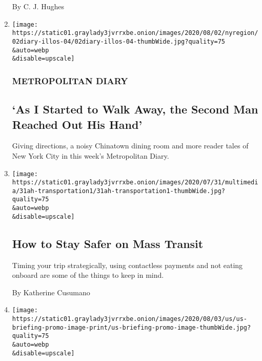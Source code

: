 \begin{enumerate}
  By C. J. Hughes
\item
  \href{/2020/08/02/nyregion/metropolitan-diary.html}{}

  \texttt{[image: https://static01.graylady3jvrrxbe.onion/images/2020/08/02/nyregion/02diary-illos-04/02diary-illos-04-thumbWide.jpg?quality=75\\\&auto=webp\\\&disable=upscale]}

  \hypertarget{metropolitan-diary}{%
  \subsubsection{METROPOLITAN DIARY}\label{metropolitan-diary}}

  \hypertarget{as-i-started-to-walk-away-the-second-man-reached-out-his-hand}{%
  \subsection{`As I Started to Walk Away, the Second Man Reached Out His
  Hand'}\label{as-i-started-to-walk-away-the-second-man-reached-out-his-hand}}

  Giving directions, a noisy Chinatown dining room and more reader tales
  of New York City in this week's Metropolitan Diary.
\item
  \href{/2020/08/01/at-home/coronavirus-public-transportation-subway.html}{}

  \texttt{[image: https://static01.graylady3jvrrxbe.onion/images/2020/07/31/multimedia/31ah-transportation1/31ah-transportation1-thumbWide.jpg?quality=75\\\&auto=webp\\\&disable=upscale]}

  \hypertarget{how-to-stay-safer-on-mass-transit}{%
  \subsection{How to Stay Safer on Mass
  Transit}\label{how-to-stay-safer-on-mass-transit}}

  Timing your trip strategically, using contactless payments and not
  eating onboard are some of the things to keep in mind.

  By Katherine Cusumano
\item
  \href{/2020/08/01/world/coronavirus-covid-19.html}{}

  \texttt{[image: https://static01.graylady3jvrrxbe.onion/images/2020/08/03/us/us-briefing-promo-image-print/us-briefing-promo-image-thumbWide.jpg?quality=75\\\&auto=webp\\\&disable=upscale]}

  \hypertarget{infections-swamp-the-us-which-recorded-42-of-all-its-coronavirus-cases-in-july}{%
}
\end{enumerate}
